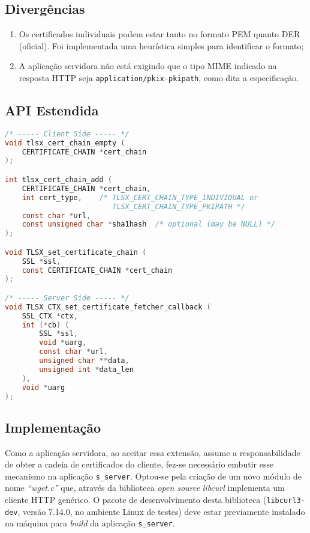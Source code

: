 \subsection{Divergências}

\begin{enumerate}
\item Os certificados individuais podem estar tanto no formato \acs{PEM} quanto 
\acs{DER} (oficial). Foi implementada uma heurística simples para identificar 
o formato;

\item A aplicação servidora não está exigindo que o tipo \acs{MIME} indicado na 
resposta HTTP seja \verb|application/pkix-pkipath|, como dita a 
especificação.
\end{enumerate}

\subsection{API Estendida}

\begin{lstlisting}[language=C,%
		    emph={tlsx_cert_chain_empty,tlsx_cert_chain_add,%
		    TLSX_set_certificate_chain,TLSX_CTX_set_certificate_fetcher_callback},%
		    caption={API Estendida para a extensão \acs{CCU}}]
/* ----- Client Side ----- */
void tlsx_cert_chain_empty (
    CERTIFICATE_CHAIN *cert_chain 
);

int tlsx_cert_chain_add (
    CERTIFICATE_CHAIN *cert_chain,
    int cert_type,    /* TLSX_CERT_CHAIN_TYPE_INDIVIDUAL or
                         TLSX_CERT_CHAIN_TYPE_PKIPATH */
    const char *url,
    const unsigned char *sha1hash  /* optional (may be NULL) */ 
);

void TLSX_set_certificate_chain (
    SSL *ssl,
    const CERTIFICATE_CHAIN *cert_chain 
);

/* ----- Server Side ----- */
void TLSX_CTX_set_certificate_fetcher_callback (
    SSL_CTX *ctx,
    int (*cb) (
        SSL *ssl,
        void *uarg,
        const char *url, 
        unsigned char **data,
        unsigned int *data_len
    ),
    void *uarg
);
\end{lstlisting}

\subsection{Implementação}

Como a aplicação servidora, ao aceitar essa extensão, assume a 
responsabilidade de obter a cadeia de certificados do cliente, fez-se necessário 
embutir esse mecanismo na aplicação \verb|s_server|. Optou-se pela criação de um 
novo módulo de nome \textit{``wget.c''} que, através da biblioteca \emph{open source} \emph{libcurl}
\cite{Libcurl} implementa um cliente \acs{HTTP} genérico. O pacote de 
desenvolvimento desta biblioteca (\verb|libcurl3-dev|, versão 7.14.0, no ambiente Linux de
testes) deve estar previamente instalado na máquina para \emph{build} da aplicação 
\verb|s_server|.

